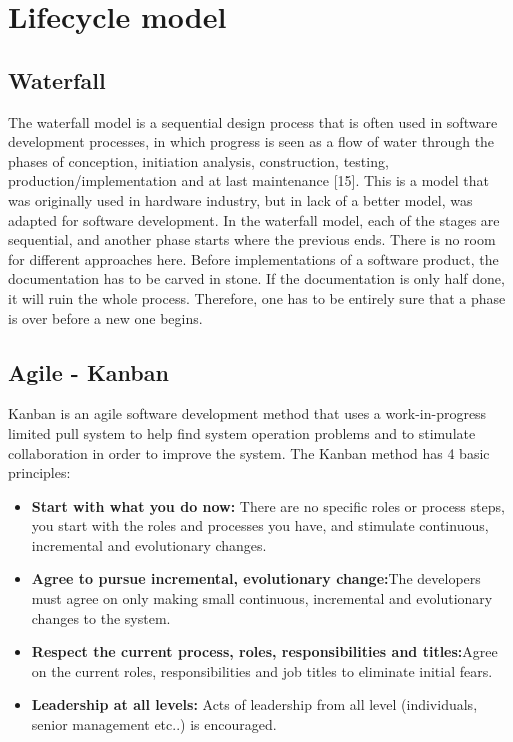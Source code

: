 \section{Lifecycle model}

\subsection{Waterfall}
The waterfall model is a sequential design process that is often used in software development processes, in which progress is seen as a flow of water through the phases of conception, initiation analysis, construction, testing, production/implementation and at last maintenance [15]. 
\newline
\newline
This is a model that was originally used in hardware industry, but in lack of a better model, was adapted for software development. In the waterfall model, each of the stages are sequential, and another phase starts where the previous ends. There is no room for different approaches here. Before implementations of a software product, the documentation has to be carved in stone. If the documentation is only half done, it will ruin the whole process. Therefore, one has to be entirely sure that a phase is over before a new one begins. 

\subsection{Agile - Kanban}
Kanban is an agile software development method that uses a work-in-progress limited pull system to help find system operation problems and to stimulate collaboration in order to improve the system.
\newline
The Kanban method has 4 basic principles:
\begin{itemize}
\item{}\textbf{Start with what you do now:} There are no specific roles or process steps, you start with the roles and processes you have, and stimulate continuous, incremental and evolutionary changes.
\item{}\textbf{Agree to pursue incremental, evolutionary change:}The developers must agree on only making small continuous, incremental and evolutionary changes to the system.
\item{}\textbf{Respect the current process, roles, responsibilities and titles:}Agree on the current roles, responsibilities and job titles to eliminate initial fears.
\item{}\textbf{Leadership at all levels:} Acts of leadership from all level (individuals, senior management etc..) is encouraged.
\end{itemize}

